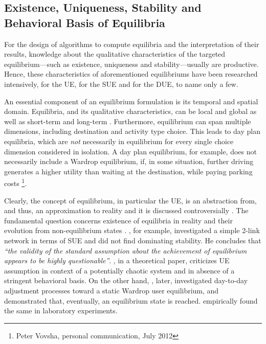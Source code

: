 \subsection{Existence, Uniqueness, Stability and Behavioral Basis of Equilibria}
\label{sec:equiCharacteristics}
For the design of algorithms to compute equilibria and the interpretation of their results, knowledge about the qualitative characteristics of the targeted equilibrium---such as existence, uniqueness and stability---usually are productive. Hence, these characteristics of aforementioned equilibriums have been researched intensively, \citet[][]{Dafermos_TransScience_1971, Smith_TransResB_1979, Smith_TransResB_1983} for the UE, \citet[][]{Daganzo_TransScience_1983} for the SUE and \citet[][]{Smith_TransResB_1993} for the DUE, to name only a few.

An essential component of an equilibrium formulation is its temporal and spatial domain. Equilibria, and its qualitative characteristics, can be local and global as well as short-term and long-term \citep[][p.8]{OrtuzarWillumsen_2001}. Furthermore, equilibrium can span multiple dimensions, including destination and activity type choice. This leads to day plan equilibria, which are \emph{not} necessarily in equilibrium for every single choice dimension considered in isolation. A day plan equilibrium, for example, does not necessarily include a Wardrop equilibrium, if, in some situation, further driving generates a higher utility than waiting at the destination, while paying parking costs \footnote{Peter Vovsha, personal communication, July 2012}. %

Clearly, the concept of equilibrium, in particular the UE, is an abstraction from, and thus, an approximation to reality and it is discussed controversially \citep[see e.g.,][p.58ff]{Patriksson_1994}. The fundamental question concerns existence of equilibria in reality and their evolution from non-equilibrium states \citep[][p.254]{PeetaZiliaskopoulos_NSE_2001}. \citet[][]{Horowitz_TransResB_1984}, for example, investigated a simple 2-link network in terms of SUE and did not find dominating stability. He concludes that \emph{``the validity of the standard assumption about the achievement of equilibrium appears to be highly questionable''}. \citet[][p.251]{Holden_JTEP_1989}, in a theoretical paper, criticizes UE assumption in context of a potentially chaotic system and in absence of a stringent behavioral basis. On the other hand, \citet[][]{FrieszEtAl_OpRes_1994}, later, investigated day-to-day adjustment processes toward a static Wardrop user equilibrium, and demonstrated that, eventually, an equilibrium state is reached. \citet{Mahmassani_unpub_WCTR_1989} empirically found the same in laboratory experiments.

